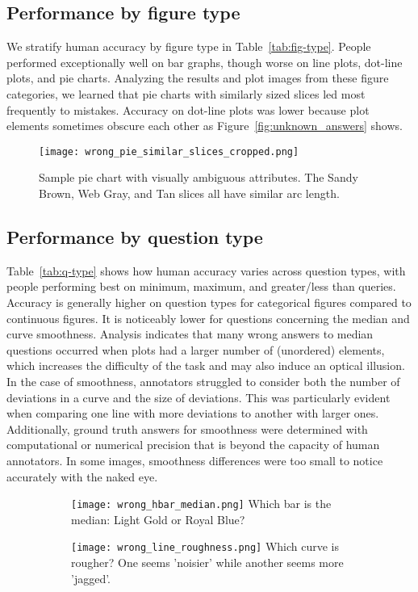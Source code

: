 \documentclass{article} \usepackage{iclr2018_workshop,times}
\begin{document}
\subsection{Performance by figure type}
We stratify human accuracy by figure type in Table~\ref{tab:fig-type}.
People performed exceptionally well on bar graphs, though worse on line plots, dot-line plots, and pie charts. Analyzing the results and plot images from these figure categories, we learned that pie charts with similarly sized slices led most frequently to mistakes. Accuracy on dot-line plots was lower because plot elements sometimes obscure each other as Figure~\ref{fig:unknown_answers} shows.

\begin{figure}[h]
    \centering
    \label{fig:wrong_answers_figure}
    \caption{Sample pie chart with visually ambiguous attributes. The Sandy Brown, Web Gray, and Tan slices all have similar arc length.}
    \texttt{[image: wrong\_pie\_similar\_slices\_cropped.png]}
\end{figure}

\subsection{Performance by question type}
Table~\ref{tab:q-type} shows how human accuracy varies across question types, with people performing best on minimum, maximum, and greater/less than queries.
Accuracy is generally higher on question types for categorical figures compared to continuous figures.
It is noticeably lower for questions concerning the median and curve smoothness.
Analysis indicates that many wrong answers to median questions occurred when plots had a larger number of (unordered) elements, which increases the difficulty of the task and may also induce an optical illusion.
In the case of smoothness, annotators struggled to consider both the number of deviations in a curve and the size of deviations. This was particularly evident when comparing one line with more deviations to another with larger ones.
Additionally, ground truth answers for smoothness were determined with computational or numerical precision that is beyond the capacity of human annotators. In some images, smoothness differences were too small to notice accurately with the naked eye.

\begin{figure}[h]
    \centering
    \caption{Sample figures with wrong answers illustrating common issues per question type.}
    \label{fig:wrong_answers_question}
    \begin{subfigure}[]{0.55\textwidth}
        \texttt{[image: wrong\_hbar\_median.png]}
        \newline
        Which bar is the median: Light Gold or Royal Blue?
    \end{subfigure}\begin{subfigure}[]{0.45\textwidth}
        \texttt{[image: wrong\_line\_roughness.png]}
        Which curve is rougher? One seems 'noisier' while another seems more 'jagged'.
    \end{subfigure}
\end{figure}
\end{document}
